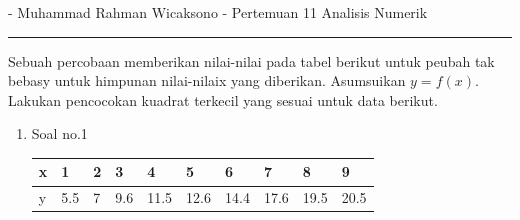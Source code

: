 \documentclass[12pt]{article}
\begin{document}
 - Muhammad Rahman Wicaksono - Pertemuan 11 Analisis Numerik\\
\noindent\rule{\textwidth}{0.2pt}\bigbreak

Sebuah percobaan memberikan nilai-nilai pada tabel berikut untuk peubah tak
bebasy untuk himpunan nilai-nilaix yang diberikan. Asumsuikan $y=f(x)$.
Lakukan pencocokan kuadrat terkecil yang sesuai untuk data berikut.
\begin{enumerate}
    \item {
        Soal no.1

        \begin{tabular}{|p{1cm}|p{1cm}|p{1cm}|p{1cm}|p{1cm}|p{1cm}|p{1cm}|p{1cm}|p{1cm}|p{1cm}|}
            \hline
            x & 1   & 2 & 3   & 4    & 5    & 6    & 7    & 8    & 9    \\ \hline
            y & 5.5 & 7 & 9.6 & 11.5 & 12.6 & 14.4 & 17.6 & 19.5 & 20.5 \\ \hline
        \end{tabular}

}
\end{enumerate}
\end{document}
